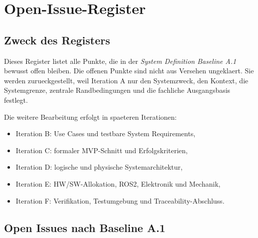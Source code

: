 \chapter{Open-Issue-Register}
\label{chap:open-points}

\section{Zweck des Registers}

Dieses Register listet alle Punkte, die in der \emph{System Definition Baseline A.1} bewusst offen bleiben. Die offenen Punkte sind nicht aus Versehen ungeklaert. Sie werden zurueckgestellt, weil Iteration A nur den Systemzweck, den Kontext, die Systemgrenze, zentrale Randbedingungen und die fachliche Ausgangsbasis festlegt.

Die weitere Bearbeitung erfolgt in spaeteren Iterationen:
\begin{itemize}
  \item Iteration B: Use Cases und testbare System Requirements,
  \item Iteration C: formaler MVP-Schnitt und Erfolgskriterien,
  \item Iteration D: logische und physische Systemarchitektur,
  \item Iteration E: HW/SW-Allokation, ROS2, Elektronik und Mechanik,
  \item Iteration F: Verifikation, Testumgebung und Traceability-Abschluss.
\end{itemize}

\section{Open Issues nach Baseline A.1}

